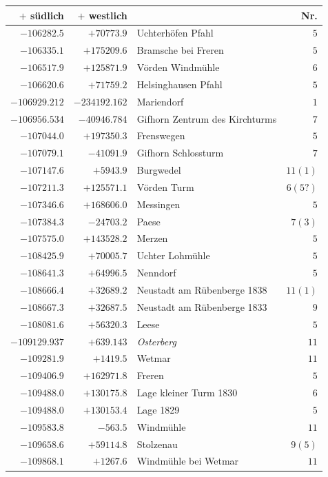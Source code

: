 \begin{center}\begingroup\fontsize{8}{9}\selectfont
\setlength{\tabcolsep}{4pt}
\begin{tabular}{r|r|p{170pt}|r}\hline
\(+\) südlich&\(+\) westlich&&Nr.\\\hline
\(-106282.5\)&\(+70773.9\)&Uchterhöfen Pfahl&\(5\)\\
\(-106335.1\)&\(+175209.6\)&Bramsche bei Freren&\(5\)\\
\(-106517.9\)&\(+125871.9\)&Vörden Windmühle&\(6\)\\
\(-106620.6\)&\(+71759.2\)&Helsinghausen Pfahl&\(5\)\\
\(-106929.212\)&\(-234192.162\)&Mariendorf&\(1\)\\
\(-106956.534\)&\(-40946.784\)&Gifhorn Zentrum des Kirchturms&\(7\)\\
\(-107044.0\)&\(+197350.3\)&Frenswegen&\(5\)\\
\(-107079.1\)&\(-41091.9\)&Gifhorn Schlossturm&\(7\)\\
\(-107147.6\)&\(+5943.9\)&Burgwedel&\(11 (1)\)\\
\(-107211.3\)&\(+125571.1\)&Vörden Turm&\(6(5?)\)\\
\(-107346.6\)&\(+168606.0\)&Messingen&\(5\)\\
\(-107384.3\)&\(-24703.2\)&Paese&\(7 (3)\)\\
\(-107575.0\)&\(+143528.2\)&Merzen&\(5\)\\
\(-108425.9\)&\(+70005.7\)&Uchter Lohmühle&\(5\)\\
\(-108641.3\)&\(+64996.5\)&Nenndorf&\(5\)\\
\(-108666.4\)&\(+32689.2\)&Neustadt am Rübenberge 1838&\(11 (1)\)\\
\(-108667.3\)&\(+32687.5\)&Neustadt am Rübenberge 1833&\(9\)\\
\(-108081.6\)&\(+56320.3\)&Leese&\(5\)\\
\(-109129.937\)&\(+639.143\)&\textit{Osterberg}&\(11\)\\
\(-109281.9\)&\(+1419.5\)&Wetmar&\(11\)\\
\(-109406.9\)&\(+162971.8\)&Freren&\(5\)\\
\(-109488.0\)&\(+130175.8\)&Lage kleiner Turm 1830&\(6\)\\
\(-109488.0\)&\(+130153.4\)&Lage 1829&\(5\)\\
\(-109583.8\)&\(-563.5\)&Windmühle&\(11\)\\
\(-109658.6\)&\(+59114.8\)&Stolzenau&\(9 (5)\)\\
\(-109868.1\)&\(+1267.6\)&Windmühle bei Wetmar&\(11\)\\

\end{tabular}
\end{center}
